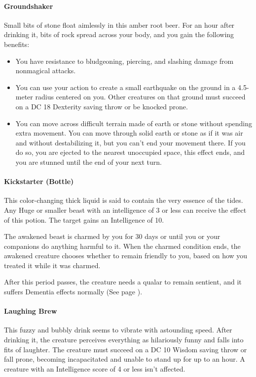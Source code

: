 \paragraph{Groundshaker} %
    Small bits of stone float aimlessly in this amber root beer.
    For an hour after drinking it, bits of rock spread across your body, and you gain the following benefits:
    \begin{itemize}
        \item You have resistance to bludgeoning, piercing, and slashing damage from nonmagical attacks.
        \item You can use your action to create a small earthquake on the ground in a 4.5-meter radius centered on you.
        Other creatures on that ground must succeed on a DC 18 Dexterity saving throw or be knocked prone.
        \item You can move across difficult terrain made of earth or stone without spending extra movement.
        You can move through solid earth or stone as if it was air and without destabilizing it, but you can't end your movement there.
        If you do so, you are ejected to the nearest unoccupied space, this effect ends, and you are stunned until the end of your next turn.
    \end{itemize}
\paragraph{Kickstarter (Bottle)} %
    This color-changing thick liquid is said to contain the very essence of the tides.
    Any Huge or smaller beast with an intelligence of 3 or less can receive the effect of this potion.
    The target gains an Intelligence of 10.

    The awakened beast is charmed by you for 30 days or until you or your companions do anything harmful to it.
    When the charmed condition ends, the awakened creature chooses whether to remain friendly to you, based on how you treated it while it was charmed.

    After this period passes, the creature needs a qualar to remain sentient, and it suffers Dementia effects normally (See page \pageref{ssec::dementia}).
\paragraph{Laughing Brew} %
    This fuzzy and bubbly drink seems to vibrate with astounding speed.
    After drinking it, the creature perceives everything as hilariously funny and falls into fits of laughter.
    The creature must succeed on a DC 10 Wisdom saving throw or fall prone, becoming incapacitated and unable to stand up for up to an hour.
    A creature with an Intelligence score of 4 or less isn't affected.

